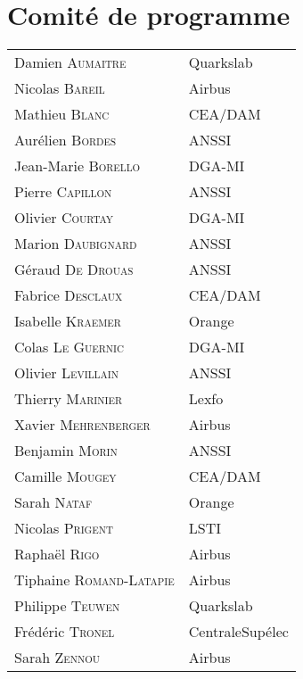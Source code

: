 \section*{Comité de programme}
\begin{tabular}{@{}p{5cm}@{}p{6.5cm}@{}}
  Damien \textsc{Aumaitre}        & Quarkslab           \\
  Nicolas  \textsc{Bareil}        & Airbus              \\
  Mathieu \textsc{Blanc}          & CEA/DAM             \\
  Aurélien \textsc{Bordes}        & ANSSI               \\
  Jean-Marie \textsc{Borello}     & DGA-MI              \\
  Pierre   \textsc{Capillon}      & ANSSI               \\
  Olivier \textsc{Courtay}        & DGA-MI              \\
  Marion \textsc{Daubignard}      & ANSSI               \\
  Géraud \textsc{De Drouas}       & ANSSI               \\
  Fabrice \textsc{Desclaux}       & CEA/DAM             \\
  Isabelle \textsc{Kraemer}       & Orange              \\
  Colas \textsc{Le Guernic}       & DGA-MI              \\
  Olivier \textsc{Levillain}      & ANSSI               \\
  Thierry \textsc{Marinier}       & Lexfo               \\
  Xavier \textsc{Mehrenberger}    & Airbus              \\
  Benjamin \textsc{Morin}         & ANSSI               \\
  Camille \textsc{Mougey}         & CEA/DAM             \\
  Sarah \textsc{Nataf}            & Orange              \\
  Nicolas \textsc{Prigent}        & LSTI                \\
  Raphaël \textsc{Rigo}           & Airbus              \\
  Tiphaine \textsc{Romand-Latapie} & Airbus             \\
  Philippe \textsc{Teuwen}        & Quarkslab           \\
  Frédéric \textsc{Tronel}        & CentraleSupélec     \\
  Sarah \textsc{Zennou}           & Airbus              \\
\end{tabular}
